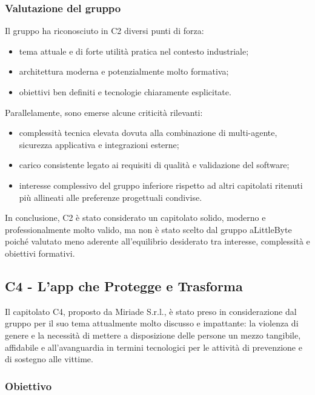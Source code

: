 \documentclass[a4paper,12pt]{article}
\begin{document}
\subsubsection{Valutazione del gruppo}

Il gruppo ha riconosciuto in C2 diversi punti di forza:

\begin{itemize}
    \item tema attuale e di forte utilità pratica nel contesto industriale;
    \item architettura moderna e potenzialmente molto formativa;
    \item obiettivi ben definiti e tecnologie chiaramente esplicitate.
\end{itemize}

Parallelamente, sono emerse alcune criticità rilevanti:

\begin{itemize}
    \item complessità tecnica elevata dovuta alla combinazione di multi-agente, sicurezza applicativa e integrazioni esterne;
    \item carico consistente legato ai requisiti di qualità e validazione del software;
    \item interesse complessivo del gruppo inferiore rispetto ad altri capitolati ritenuti più allineati alle preferenze progettuali condivise.
\end{itemize}

In conclusione, C2 è stato considerato un capitolato solido, moderno e professionalmente molto valido, ma non è stato scelto dal gruppo aLittleByte poiché valutato meno aderente all'equilibrio desiderato tra interesse, complessità e obiettivi formativi.

\subsection{C4 - L'app che Protegge e Trasforma}

Il capitolato C4, proposto da Miriade S.r.l., è stato preso in considerazione dal gruppo per il suo tema attualmente molto discusso e impattante: la violenza di genere e la necessità di mettere a disposizione delle persone un mezzo tangibile, affidabile e all'avanguardia in termini tecnologici per le attività di prevenzione e di sostegno alle vittime.

\subsubsection{Obiettivo}
\end{document}
